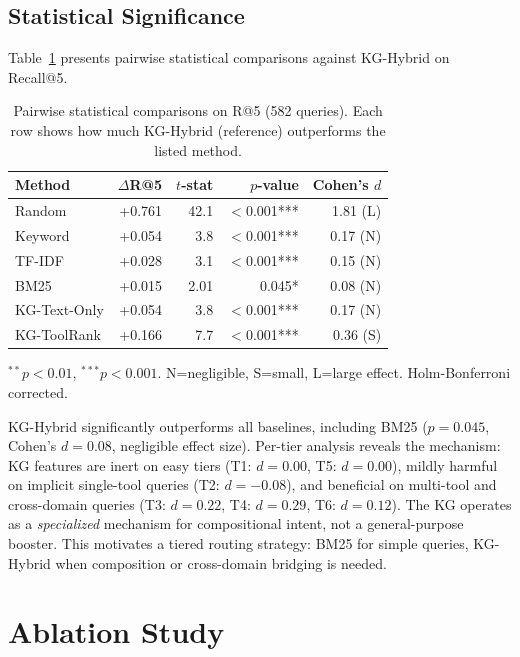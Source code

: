 \documentclass[11pt,a4paper]{article}
\begin{document}
\subsection{Statistical Significance}

Table~\ref{tab:significance} presents pairwise statistical comparisons against KG-Hybrid on Recall@5.

\begin{table}[t]
\centering
\caption{Pairwise statistical comparisons on R@5 (582 queries). Each row shows how much KG-Hybrid (reference) outperforms the listed method.}
\label{tab:significance}
\begin{tabular}{lrrrr}
\toprule
Method & $\Delta$R@5 & $t$-stat & $p$-value & Cohen's $d$ \\
\midrule
Random & +0.761 & 42.1 & $<$0.001*** & 1.81 (L) \\
Keyword & +0.054 & 3.8 & $<$0.001*** & 0.17 (N) \\
TF-IDF & +0.028 & 3.1 & $<$0.001*** & 0.15 (N) \\
BM25 & +0.015 & 2.01 & 0.045* & 0.08 (N) \\
KG-Text-Only & +0.054 & 3.8 & $<$0.001*** & 0.17 (N) \\
KG-ToolRank & +0.166 & 7.7 & $<$0.001*** & 0.36 (S) \\
\bottomrule
\end{tabular}
\vspace{2pt}
\footnotesize{$^{**}p<0.01$, $^{***}p<0.001$. N=negligible, S=small, L=large effect. Holm-Bonferroni corrected.}
\end{table}

KG-Hybrid significantly outperforms all baselines, including BM25 ($p=0.045$, Cohen's $d=0.08$, negligible effect size). Per-tier analysis reveals the mechanism: KG features are inert on easy tiers (T1: $d=0.00$, T5: $d=0.00$), mildly harmful on implicit single-tool queries (T2: $d=-0.08$), and beneficial on multi-tool and cross-domain queries (T3: $d=0.22$, T4: $d=0.29$, T6: $d=0.12$). The KG operates as a \emph{specialized} mechanism for compositional intent, not a general-purpose booster. This motivates a tiered routing strategy: BM25 for simple queries, KG-Hybrid when composition or cross-domain bridging is needed.

\section{Ablation Study}
\label{sec:ablation}
\end{document}
